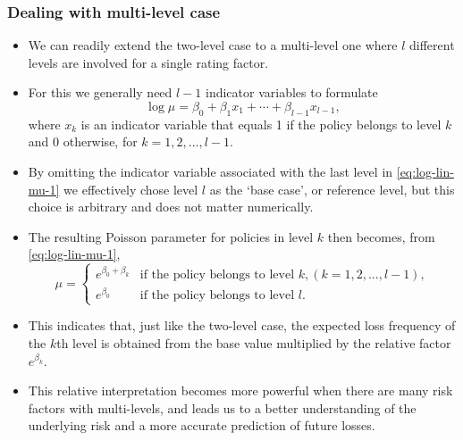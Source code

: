 \documentclass[ignorenonframetext,]{beamer}
\begin{document}
\begin{frame}[allowframebreaks]
\frametitle{Dealing with multi-level case}

\begin{itemize}
\item We can readily extend the two-level case to a multi-level one where $l$ different levels are involved for a single rating factor. 
\item For this we generally need $l-1$ indicator variables to formulate
\begin{equation} \label{eq:log-lin-mu-1}
\log \mu=\beta_0+\beta_1 x_1+\cdots+\beta_{l-1} x_{l-1},
\end{equation}
where $x_k$ is an indicator variable that equals 1 if the policy belongs to level $k$ and 0 otherwise, for $k=1,2, \ldots, l-1$. 
\item By omitting the indicator variable associated with the last level in \eqref{eq:log-lin-mu-1} we effectively chose level $l$ as the `base case', or reference level, but this choice is arbitrary and does not matter numerically. 
\end{itemize}

\framebreak

\begin{itemize}
\item The resulting Poisson parameter for policies in level $k$ then becomes, from \eqref{eq:log-lin-mu-1},
$$
\mu= 
\begin{cases}
     e^{\beta_0+\beta_k} & \text{if the policy belongs to level } k, (k=1,2, ..., l-1), \\
     e^{\beta_0} & \text{if the policy belongs to level } l.
\end{cases}
$$
\item This indicates that, just like the two-level case, the expected loss frequency of the $k$th level is obtained from the base value multiplied by the relative factor $e^{\beta_k}$. 
\item This relative interpretation becomes more powerful when there are many risk factors with multi-levels, and leads us to a better understanding  of the underlying risk and a more accurate prediction of future losses.
\end{itemize}

\end{frame}
\end{document}
